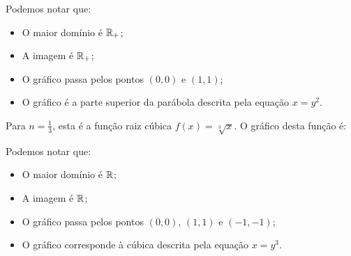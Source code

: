     Podemos notar que:
    \begin{itemize}
        \item O maior domínio é $\mathbb{R}_{+}$;
        \item A imagem é $\mathbb{R}_{+}$;
        \item O gráfico passa pelos pontos $(0,0)$ e $(1,1)$;
        \item O gráfico é a parte superior da parábola descrita pela equação $x=y^2$.
    \end{itemize}

Para $n=\frac{1}{3}$, esta é a função raiz cúbica $f(x)=\sqrt[3]{x}$. O gráfico desta função é:
\begin{center}
\end{center}

    Podemos notar que:
    \begin{itemize}
        \item O maior domínio é $\mathbb{R}$;
        \item A imagem é $\mathbb{R}$;
        \item O gráfico passa pelos pontos $(0,0)$, $(1,1)$ e $(-1,-1)$;
        \item O gráfico corresponde à cúbica descrita pela equação $x=y^3$.
    \end{itemize}
    



